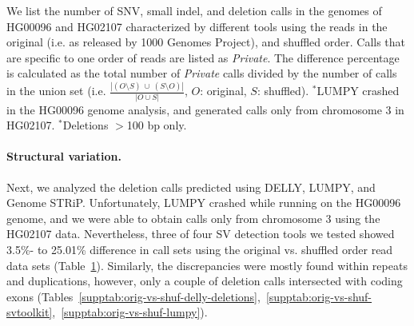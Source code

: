 \documentclass{bioinfo}
\begin{document}
\begin{table}[htb]
\begin{center}
\begin{tabular}{|l|c|c||c|c||c|}
\end{tabular}
\end{center}
{\scriptsize  We list the number of SNV, small indel, and deletion calls in the genomes of HG00096 and HG02107 characterized by different tools using the reads in the original (i.e. as released by 1000 Genomes Project), and shuffled order.
  Calls that are specific to one order of reads are listed as {\it Private}. The difference percentage is calculated as the total number of {\it Private} calls divided by the number of calls in the union set  (i.e. $\frac{|(O\setminus S)~\cup~ (S\setminus O)|}{|O\cup S|}$, $O$: original, $S$: shuffled). $^*$LUMPY crashed in the HG00096 genome analysis, and generated calls only from chromosome 3 in HG02107. $^\ast$Deletions $>$100 bp only.}
\label{tab:vars-orig-vs-shuf}
\end{table}


\paragraph{Structural variation.}
Next, we analyzed the deletion calls predicted using DELLY, LUMPY, and Genome STRiP. Unfortunately, LUMPY crashed while running on the HG00096 genome, and we were able to obtain calls only from chromosome 3 using the HG02107 data. Nevertheless, three of four SV detection tools we tested showed 3.5\%- to 25.01\% difference in call sets using the original vs. shuffled order read data sets (Table~\ref{tab:vars-orig-vs-shuf}). Similarly, the discrepancies were mostly found within repeats and duplications, however, only a couple of deletion calls intersected with coding exons (Tables~\ref{supptab:orig-vs-shuf-delly-deletions},~\ref{supptab:orig-vs-shuf-svtoolkit},~\ref{supptab:orig-vs-shuf-lumpy}). 
\end{document}
